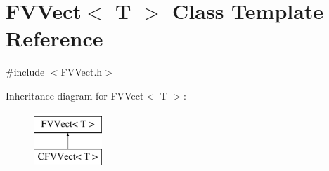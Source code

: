 \hypertarget{classFVL_1_1FVVect}{
\section{FVVect$<$ T $>$ Class Template Reference}
\label{de/da1/classFVL_1_1FVVect}
}


{\ttfamily \#include $<$FVVect.h$>$}

Inheritance diagram for FVVect$<$ T $>$:\begin{figure}[H]
\begin{center}
\leavevmode
\includegraphics[height=2.000000cm]{de/da1/classFVL_1_1FVVect}
\end{center}
\end{figure}
